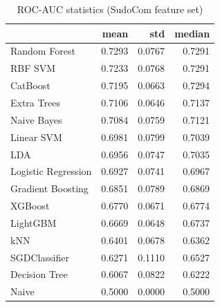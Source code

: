 \begin{table}
\caption{ROC-AUC statistics (SudoCom feature set)}
\label{tab:roc-auc_SudoCom_stats}
\begin{tabular}{lrrr}
\toprule
 & mean & std & median \\
\midrule
Random Forest & 0.7293 & 0.0767 & 0.7291 \\
RBF SVM & 0.7233 & 0.0768 & 0.7291 \\
CatBoost & 0.7195 & 0.0663 & 0.7294 \\
Extra Trees & 0.7106 & 0.0646 & 0.7137 \\
Naive Bayes & 0.7084 & 0.0759 & 0.7121 \\
Linear SVM & 0.6981 & 0.0799 & 0.7039 \\
LDA & 0.6956 & 0.0747 & 0.7035 \\
Logistic Regression & 0.6927 & 0.0741 & 0.6967 \\
Gradient Boosting & 0.6851 & 0.0789 & 0.6869 \\
XGBoost & 0.6770 & 0.0671 & 0.6774 \\
LightGBM & 0.6669 & 0.0648 & 0.6737 \\
kNN & 0.6401 & 0.0678 & 0.6362 \\
SGDClassifier & 0.6271 & 0.1110 & 0.6527 \\
Decision Tree & 0.6067 & 0.0822 & 0.6222 \\
Naive & 0.5000 & 0.0000 & 0.5000 \\
\bottomrule
\end{tabular}
\end{table}
